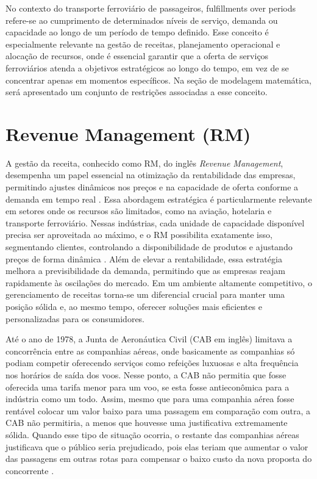 \begin{description}[style=unboxed, leftmargin=0cm]
    \item[Fulfillments over periods:] No contexto do transporte ferroviário de passageiros, fulfillments over periods refere-se ao cumprimento de determinados níveis de serviço, demanda ou capacidade ao longo de um período de tempo definido. Esse conceito é especialmente relevante na gestão de receitas, planejamento operacional e alocação de recursos, onde é essencial garantir que a oferta de serviços ferroviários atenda a objetivos estratégicos ao longo do tempo, em vez de se concentrar apenas em momentos específicos. Na seção de modelagem matemática, será apresentado um conjunto de restrições associadas a esse conceito.
\end{description}


\section{Revenue Management (RM)}
A gestão da receita, conhecido como RM, do inglês \textit{Revenue Management}, desempenha um papel essencial na otimização da rentabilidade das empresas, permitindo ajustes dinâmicos nos preços e na capacidade de oferta conforme a demanda em tempo real \parencite{Gallego1994}. Essa abordagem estratégica é particularmente relevante em setores onde os recursos são limitados, como na aviação, hotelaria e transporte ferroviário. Nessas indústrias, cada unidade de capacidade disponível precisa ser aproveitada ao máximo, e o RM possibilita exatamente isso, segmentando clientes, controlando a disponibilidade de produtos e ajustando preços de forma dinâmica \parencite{HEO2009446}. Além de elevar a rentabilidade, essa estratégia melhora a previsibilidade da demanda, permitindo que as empresas reajam rapidamente às oscilações do mercado. Em um ambiente altamente competitivo, o gerenciamento de receitas torna-se um diferencial crucial para manter uma posição sólida e, ao mesmo tempo, oferecer soluções mais eficientes e personalizadas para os consumidores.

Até o ano de 1978, a Junta de Aeronáutica Civil (CAB em inglês) limitava a concorrência entre as companhias aéreas, onde basicamente as companhias só podiam competir oferecendo serviços como refeições luxuosas e alta frequência nos horários de saída dos voos. Nesse ponto, a CAB não permitia que fosse oferecida uma tarifa menor para um voo, se esta fosse antieconômica para a indústria como um todo. Assim, mesmo que para uma companhia aérea fosse rentável colocar um valor baixo para uma passagem em comparação com outra, a CAB não permitiria, a menos que houvesse uma justificativa extremamente sólida. Quando esse tipo de situação ocorria, o restante das companhias aéreas justificava que o público seria prejudicado, pois elas teriam que aumentar o valor das passagens em outras rotas para compensar o baixo custo da nova proposta do concorrente \parencite{article_base}.


